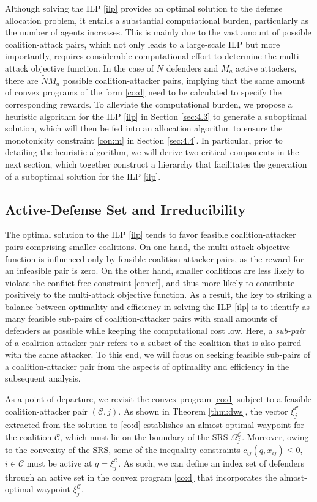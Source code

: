 \documentclass[journal]{IEEEtran}
\newcommand{\C}{\mathcal{C}}
\newcommand{\1}{\mathbf{1}}
\begin{document}
Although solving the ILP \eqref{ilp} provides an optimal solution to the defense allocation problem, it entails a substantial computational burden, particularly as the number of agents increases. This is mainly due to the vast amount of possible coalition-attack pairs, which not only leads to a large-scale ILP but more importantly, requires considerable computational effort to determine the multi-attack objective function. In the case of $N$ defenders and $M_a$ active attackers, there are $\tilde{N}M_a$ possible coalition-attacker pairs, implying that the same amount of convex programs of the form \eqref{co:d} need to be calculated to specify the corresponding rewards. 
To alleviate the computational burden, we propose a heuristic algorithm for the ILP \eqref{ilp} in Section \ref{sec:4.3} to generate a suboptimal solution, which will then be fed into an allocation algorithm to ensure the monotonicity constraint \eqref{con:m} in Section \ref{sec:4.4}. In particular, prior to detailing the heuristic algorithm, we will derive two critical components in the next section, which together construct a hierarchy that facilitates the generation of a suboptimal solution for the ILP \eqref{ilp}.

\subsection{Active-Defense Set and Irreducibility}

The optimal solution to the ILP \eqref{ilp} tends to favor feasible coalition-attacker pairs comprising smaller coalitions. On one hand, the multi-attack objective function is influenced only by feasible coalition-attacker pairs, as the reward for an infeasible pair is zero. On the other hand, smaller coalitions are less likely to violate the conflict-free constraint \eqref{con:cf}, and thus more likely to contribute positively to the multi-attack objective function. As a result, the key to striking a balance between optimality and efficiency in solving the ILP \eqref{ilp} is to identify as many feasible sub-pairs of coalition-attacker pairs with small amounts of defenders as possible while keeping the computational cost low. Here, a \textit{sub-pair} of a coalition-attacker pair refers to a subset of the coalition that is also paired with the same attacker. To this end, we will focus on seeking feasible sub-pairs of a coalition-attacker pair from the aspects of optimality and efficiency in the subsequent analysis.
 
As a point of departure, we revisit the convex program \eqref{co:d} subject to a feasible coalition-attacker pair $(\C,j)$. As shown in Theorem \ref{thm:dws}, the vector $\xi^{\C}_j$ extracted from the solution to \eqref{co:d} establishes an almost-optimal waypoint for the coalition $\C$, which must lie on the boundary of the SRS $\Omega^{\C}_j$. Moreover, owing to the convexity of the SRS, some of the inequality constraints $c_{ij}(q,x_{ij})\leq 0$, $i\in \C$ must be active at $q=\xi^{\C}_j$. As such, we can define an index set of defenders through an active set in the convex program \eqref{co:d} that incorporates the almost-optimal waypoint $\xi^{\C}_j$.
\end{document}
